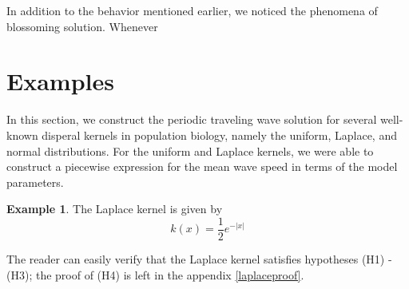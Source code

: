 \documentclass[11pt]{article}
\theoremstyle{definition}
\newtheorem{ex}[thm]{Example}
\numberwithin{equation}{section}
\numberwithin{thm}{section}
\begin{document}
In addition to the behavior mentioned earlier, we noticed the phenomena of blossoming solution. Whenever 

\section{Examples}

In this section, we construct the periodic traveling wave solution for several well-known disperal kernels in population biology, namely the uniform, Laplace, and normal distributions. For the uniform and Laplace kernels, we were able to construct a piecewise expression for the mean wave speed in terms of the model parameters. 

\begin{ex}
The Laplace kernel is given by
\begin{equation}\label{laplacekernel}
k(x) = \frac{1}{2} e^{-|x|}
\end{equation}

The reader can easily verify that the Laplace kernel satisfies hypotheses (H1) - (H3); the proof of (H4) is left in the appendix \ref{laplaceproof}.


\end{ex}
\end{document}
